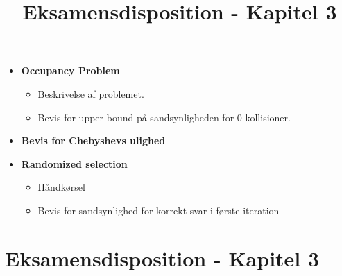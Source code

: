 
\title{Eksamensdisposition - Kapitel 3}


\maketitle

\begin{itemize}
  \item \textbf{Occupancy Problem}
  \begin{itemize}
    \item Beskrivelse af problemet.
    \item Bevis for upper bound på sandsynligheden for 0 kollisioner.
  \end{itemize}

  \item \textbf{Bevis for Chebyshevs ulighed}

  \item \textbf{Randomized selection}
  \begin{itemize}
    \item Håndkørsel
    \item Bevis for sandsynlighed for korrekt svar i første iteration
  \end{itemize}
\end{itemize}


\newpage
\section{Eksamensdisposition - Kapitel 3}







